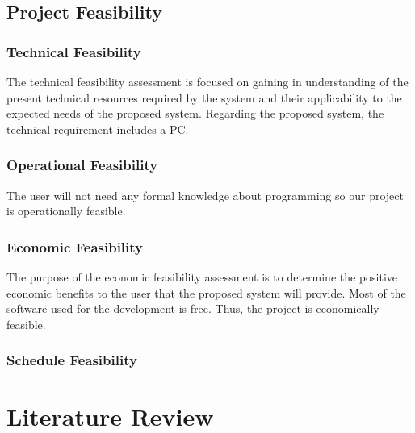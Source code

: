 \section{Project Feasibility}
\vspace{-18pt}
\subsection{Technical Feasibility}
\vspace{-18pt}
The technical feasibility assessment is focused on gaining in understanding of the present technical resources required by the system and their applicability to the expected needs of the proposed system. Regarding the proposed system, the technical requirement includes a PC.
\vspace{-18pt}
\subsection{Operational Feasibility}
\vspace{-18pt}
The user will not need any formal knowledge about programming so our project is operationally feasible.
\vspace{-18pt}
\subsection{Economic Feasibility}
\vspace{-18pt}
The purpose of the economic feasibility assessment is to determine the positive economic benefits to the user that the proposed system will provide. Most of the software used for the development is free. Thus, the project is economically feasible.
\vspace{-18pt}
\subsection{Schedule Feasibility}
\vspace{-18pt}
\chapter{Literature Review}
\vspace{-18pt}
